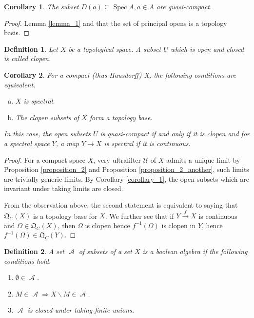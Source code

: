 \documentclass[8pt]{article}
\numberwithin{equation}{section}
\newtheorem{definition}{Definition}[subsection]
\newtheorem{corollary}{Corollary} [subsection]
\DeclareMathOperator{\Spec}{Spec}
\DeclareMathOperator{\Alg}{\mathcal{A}}
\newcommand{\U}[0]{\mathcal{U}}
\newcommand{\QC}[0]{\mathfrak{Q}_C}
\begin{document}
\begin{corollary}
    \label{corollary_2}
    The subset $D(a)\subseteq \Spec A, a\in A$ are quasi-compact.
\end{corollary}
\begin{proof}
    Lemma \ref{lemma_1} and that the set of principal opens is a topology basis.
\end{proof}
\begin{definition}
    Let $X$ be a topological space. A subset $U$ which is open and closed is called clopen.
\end{definition}
\begin{corollary}
    \label{corollary_3}
    For a compact (thus Hausdorff) X, the following conditions are equivalent.
    \begin{enumerate}[a.]
        \item $X$ is spectral.
        \item The clopen subsets of $X$ form a topology base.
    \end{enumerate}
    In this case, the open subsets $U$ is quasi-compact if and only if it is clopen and for a spectral space $Y$, a map $Y\to X$ is spectral if it is continuous.
\end{corollary}
\begin{proof}
    For a compact space $X$, very ultrafilter $\U$ of $X$ admits a unique limit by Proposition \ref{proposition_2} and Proposition \ref{proposition_2_another}, such limits are trivially generic limits. By Corollary \ref{corollary_1}, the open subsets which are invariant under taking limits are closed.%
    \par From the observation above, the second statement is equivalent to saying that $\QC(X)$ is a topology base for $X$. 
    We further see that if $Y\stackrel{f}{\to} X$ is continuous and $\Omega\in\QC(X)$, then $\Omega$ is clopen hence $f^{-1}(\Omega)$ is clopen in $Y$, hence $f^{-1}(\Omega)\in \QC(Y)$.
\end{proof}
\begin{definition}
    A set $\Alg$ of subsets of a set $X$ is a boolean algebra if the following conditions hold.
    \begin{enumerate}
        \item $\emptyset\in\Alg$.
        \item $M\in\Alg\Rightarrow X\backslash M\in\Alg$.
        \item $\Alg$ is closed under taking finite unions.
    \end{enumerate}
\end{definition}
\end{document}
